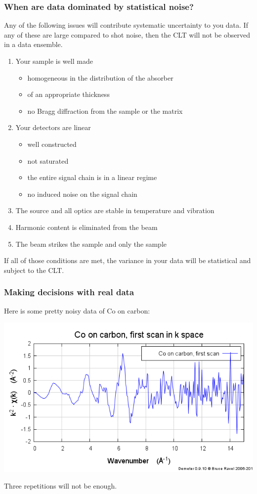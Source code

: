 \documentclass[10pt, xcolor=x11names, compress]{beamer}
\begin{document}
\begin{frame}
  \frametitle{When are data dominated by statistical noise?}
  \begin{block}{}
    Any of the following issues will contribute systematic uncertainty
    to you data.  If any of these are large compared to shot noise,
    then the CLT will not be observed in a data ensemble.
  \end{block}
  \begin{enumerate}
  \item Your sample is well made
    \begin{itemize}
    \item homogeneous in the distribution of the absorber
    \item of an appropriate thickness
    \item no Bragg diffraction from the sample or the matrix
    \end{itemize}
  \item Your detectors are linear
    \begin{itemize}
    \item well constructed
    \item not saturated
    \item the entire signal chain is in a linear regime
    \item no induced noise on the signal chain
    \end{itemize}
  \item The source and all optics are stable in temperature and
    vibration
  \item Harmonic content is eliminated from the beam
  \item The beam strikes the sample and only the sample
  \end{enumerate}
  \begin{alertblock}{}
    If all of those conditions are met, the variance in your data will
    be statistical and subject to the CLT.
  \end{alertblock}
\end{frame}

\begin{frame}
  \frametitle{Making decisions with real data}
  \begin{center}
    Here is some pretty noisy data of Co on carbon:

    \bigskip

    \includegraphics[width=0.7\linewidth]{images/firstscan.png}

    \bigskip

    Three repetitions will not be enough.
  \end{center}
\end{frame}
\end{document}
